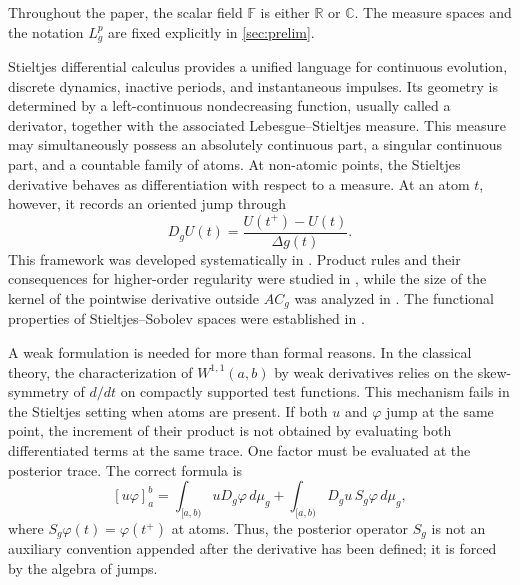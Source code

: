 \documentclass[preprint,12pt]{elsarticle}
\newenvironment{revision}{\begingroup\color{red}}{\endgroup}
\newenvironment{revision}{}{}
\theoremstyle{definition}
\theoremstyle{remark}
\newcommand{\R}{\mathbb R}
\newcommand{\F}{\mathbb F}
\begin{document}
\begin{revision}
Throughout the paper, the scalar field \(\F\) is either \(\R\) or
\(\mathbb C\).  The measure spaces and the notation \(L_g^p\) are fixed
explicitly in \cref{sec:prelim}.
\end{revision}

Stieltjes differential calculus provides a unified language for continuous evolution, discrete dynamics, inactive periods, and instantaneous impulses. Its geometry is determined by a left-continuous nondecreasing function, usually called a derivator, together with the associated Lebesgue--Stieltjes measure. This measure may simultaneously possess an absolutely continuous part, a singular continuous part, and a countable family of atoms. At non-atomic points, the Stieltjes derivative behaves as differentiation with respect to a measure. At an atom $t$, however, it records an oriented jump through
\[
 D_gU(t)=\frac{U(t^+)-U(t)}{\Delta g(t)}.
\]
This framework was developed systematically in \cite{LoRo14,FriLo17,LoMa18,MaMon20}. Product rules and their consequences for higher-order regularity were studied in \cite{FerMarToj25Product}, while the size of the kernel of the pointwise derivative outside $AC_g$ was analyzed in \cite{FerMarTojVil25Kernel}. The functional properties of Stieltjes--Sobolev spaces were established in \cite{FerToVil24}.

A weak formulation is needed for more than formal reasons. In the classical theory, the characterization of $W^{1,1}(a,b)$ by weak derivatives relies on the skew-symmetry of $d/dt$ on compactly supported test functions. This mechanism fails in the Stieltjes setting when atoms are present. If both $u$ and $\varphi$ jump at the same point, the increment of their product is not obtained by evaluating both differentiated terms at the same trace. One factor must be evaluated at the posterior trace. The correct formula is
\begin{equation}\label{eq:intro-ibp}
 [u\varphi]_a^b
 =\int_{[a,b)}uD_g\varphi\,d\mu_g
 +\int_{[a,b)}D_gu\,S_g\varphi\,d\mu_g,
\end{equation}
where $S_g\varphi(t)=\varphi(t^+)$ at atoms. Thus, the posterior operator $S_g$ is not an auxiliary convention appended after the derivative has been defined; it is forced by the algebra of jumps.
\end{document}
